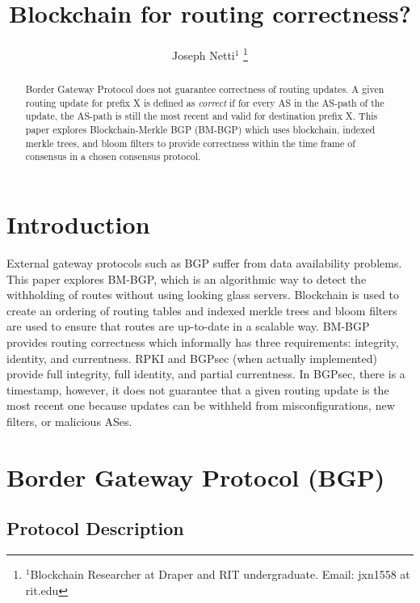 \documentclass[letterpaper, 10 pt, conference]{ieeeconf}  %
\title{\LARGE \bf
Blockchain for routing correctness?
}
\author{Joseph Netti$^{1}$%
\thanks{$^{1}$Blockchain Researcher at Draper and RIT undergraduate. Email: jxn1558 at rit.edu}%
}
\begin{document}
\maketitle
\thispagestyle{empty}
\pagestyle{empty}


\begin{abstract}
Border Gateway Protocol does not guarantee correctness of routing updates. A given routing update for prefix X is defined as \textit{correct} if for every AS in the AS-path of the update, the AS-path is still the most recent and valid for destination prefix X. This paper explores Blockchain-Merkle BGP (BM-BGP) which uses blockchain, indexed merkle trees, and bloom filters to provide correctness within the time frame of consensus in a chosen consensus protocol. 

\end{abstract}

\section{Introduction}
External gateway protocols such as BGP suffer from data availability problems. This paper explores BM-BGP, which is an algorithmic way to detect the withholding of routes without using looking glass servers. Blockchain is used to create an ordering of routing tables and indexed merkle trees and bloom filters are used to ensure that routes are up-to-date in a scalable way. BM-BGP provides routing correctness which informally has three requirements: integrity, identity, and currentness. RPKI and BGPsec (when actually implemented) provide full integrity, full identity, and partial currentness. In BGPsec, there is a timestamp, however, it does not guarantee that a given routing update is the most recent one because updates can be withheld from misconfigurations, new filters, or malicious ASes. 


\section{Border Gateway Protocol (BGP)}

\subsection{Protocol Description}
\end{document}
